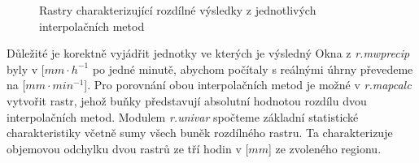 \documentclass[a4paper,12pt,oneside]{report}
\begin{document}
\begin{figure}[h!]%
    \centering
    \qquad
    \qquad
    \qquad
    \caption[Průměr metod]{ Rastry charakterizující rozdílné výsledky z jednotlivých interpolačních metod\centering}

\end{figure}
Důležité je korektně vyjádřit jednotky ve kterých je výsledný 
Okna z \textit{r.mwprecip}  byly v [$mm \cdot h^{-1}$ po jedné minutě, abychom počítaly s reálnými úhrny převedeme na [$mm \cdot min^{-1}$].
Pro porovnání obou interpolačních metod je možné v \textit{r.mapcalc} vytvořit rastr, jehož buňky představují absolutní hodnotou rozdílu dvou interpolačních metod. Modulem \textit{r.univar} spočteme základní statistické charakteristiky včetně sumy všech buněk rozdílného rastru. Ta charakterizuje objemovou odchylku dvou rastrů ze tří hodin v [$mm$] ze zvoleného regionu.
\end{document}
